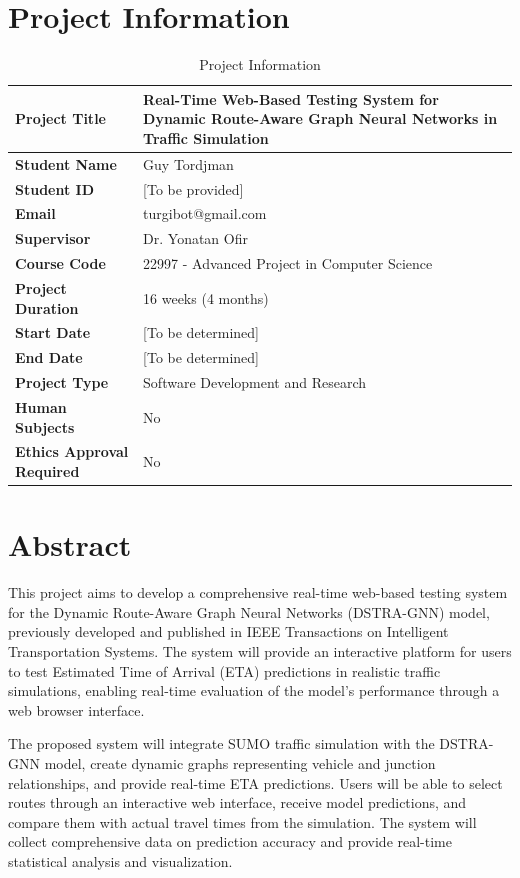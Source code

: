 \documentclass[12pt,a4paper]{article}
\begin{document}


\section{Project Information}

\begin{table}[h]
\centering
\begin{tabular}{|l|l|}
\hline
\textbf{Project Title} & Real-Time Web-Based Testing System for Dynamic Route-Aware Graph Neural Networks in Traffic Simulation \\
\hline
\textbf{Student Name} & Guy Tordjman \\
\hline
\textbf{Student ID} & [To be provided] \\
\hline
\textbf{Email} & turgibot@gmail.com \\
\hline
\textbf{Supervisor} & Dr. Yonatan Ofir \\
\hline
\textbf{Course Code} & 22997 - Advanced Project in Computer Science \\
\hline
\textbf{Project Duration} & 16 weeks (4 months) \\
\hline
\textbf{Start Date} & [To be determined] \\
\hline
\textbf{End Date} & [To be determined] \\
\hline
\textbf{Project Type} & Software Development and Research \\
\hline
\textbf{Human Subjects} & No \\
\hline
\textbf{Ethics Approval Required} & No \\
\hline
\end{tabular}
\caption{Project Information}
\label{tab:project_info}
\end{table}

\section{Abstract}

This project aims to develop a comprehensive real-time web-based testing system for the Dynamic Route-Aware Graph Neural Networks (DSTRA-GNN) model, previously developed and published in IEEE Transactions on Intelligent Transportation Systems. The system will provide an interactive platform for users to test Estimated Time of Arrival (ETA) predictions in realistic traffic simulations, enabling real-time evaluation of the model's performance through a web browser interface.

The proposed system will integrate SUMO traffic simulation with the DSTRA-GNN model, create dynamic graphs representing vehicle and junction relationships, and provide real-time ETA predictions. Users will be able to select routes through an interactive web interface, receive model predictions, and compare them with actual travel times from the simulation. The system will collect comprehensive data on prediction accuracy and provide real-time statistical analysis and visualization.
\end{document}
